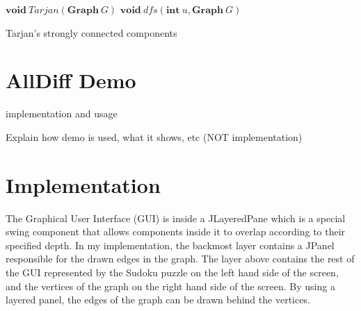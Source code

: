\documentclass{l4proj}
\begin{document}
\begin{algorithm}
\DontPrintSemicolon
\nl $\textbf{void} ~Tarjan(\textbf{Graph}~G)$ \;
\nl {}
\;
\nl $\textbf{void} ~dfs(\textbf{int}~u, \textbf{Graph}~G)$ \;
\nl {}
\caption{Tarjan's strongly connected components}
\label{TarjanPC}
\end{algorithm}

\chapter{AllDiff Demo}
\noindent implementation and usage

\noindent Explain how demo is used, what it shows, etc (NOT implementation)

 
\chapter{Implementation}
\noindent The Graphical User Interface (GUI) is inside a JLayeredPane which is a special swing component that allows components inside it to overlap according to their specified depth. In my implementation, the backmost layer contains a JPanel responsible for the drawn edges in the graph. The layer above contains the rest of the GUI represented by the Sudoku puzzle on the left hand side of the screen, and the vertices of the graph on the right hand side of the screen. By using a layered panel, the edges of the graph can be drawn behind the vertices.
\end{document}
